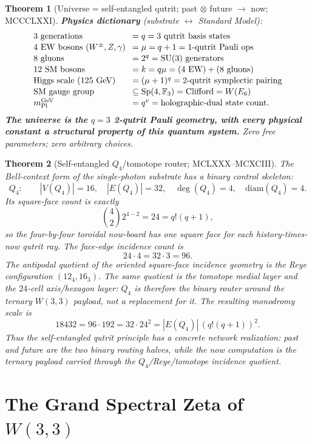 \documentclass[11pt]{article}
\newtheorem{theorem}{Theorem}[section]
\begin{document}
\begin{theorem}[Universe = self-entangled qutrit; past $\otimes$ future $\to$ now; MCCCLXXI]
\textbf{Physics dictionary} (substrate $\leftrightarrow$ Standard Model):
\[\setlength{\arraycolsep}{4pt}\begin{array}{ll}
  \text{3 generations} & = q = 3\text{ qutrit basis states} \\[1pt]
  4\ \mathrm{EW\ bosons}\ (W^\pm,Z,\gamma) & = \mu = q+1 = \text{1-qutrit Pauli ops} \\[1pt]
  \text{8 gluons} & = 2^q = \text{SU(3) generators} \\[1pt]
  \text{12 SM bosons} & = k = q\mu = (4 \text{ EW}) + (8 \text{ gluons}) \\[1pt]
  \text{Higgs scale (125 GeV)} & = (\mu+1)^q = \text{2-qutrit symplectic pairing} \\[1pt]
  \text{SM gauge group} & \subseteq \mathrm{Sp}(4,\mathbb{F}_3) = \text{Clifford} = W(E_6) \\[1pt]
  m_{\mathrm{Pl}}^{\mathrm{GeV}} & = q^v = \text{holographic-dual state count}.
\end{array}\]
\textbf{The universe is the $q=3$ 2-qutrit Pauli geometry, with
every physical constant a structural property of this quantum system.}
Zero free parameters; zero arbitrary choices.
\end{theorem}

\begin{theorem}[Self-entangled $Q_4$/tomotope router; MCLXXX--MCXCIII]\label{thm:q4_tomotope_router}
The Bell-context form of the single-photon substrate has a binary
control skeleton:
\[
  Q_4:\qquad |V(Q_4)|=16,\quad |E(Q_4)|=32,\quad \deg(Q_4)=4,\quad
  \mathrm{diam}(Q_4)=4.
\]
Its square-face count is exactly
\[
  \binom{4}{2}2^{4-2}=24=q!(q+1),
\]
so the four-by-four toroidal now-board has one square face for each
history-times-now qutrit ray.  The face-edge incidence count is
\[
  24\cdot4 = 32\cdot3 = 96.
\]
The antipodal quotient of the oriented square-face incidence geometry
is the Reye configuration $(12_4,16_3)$.  The same quotient is the
tomotope medial layer and the $24$-cell axis/hexagon layer: $Q_4$ is
therefore the binary router around the ternary $W(3,3)$ payload, not a
replacement for it.  The resulting monodromy scale is
\[
  18432 = 96\cdot192 = 32\cdot24^2 = |E(Q_4)|\,(q!(q+1))^2.
\]
Thus the self-entangled qutrit principle has a concrete network
realization: past and future are the two binary routing halves, while
the now computation is the ternary payload carried through the
$Q_4$/Reye/tomotope incidence quotient.
\end{theorem}

\section{The Grand Spectral Zeta of $W(3,3)$}\label{sec:spectral_zeta_master}
\end{document}
